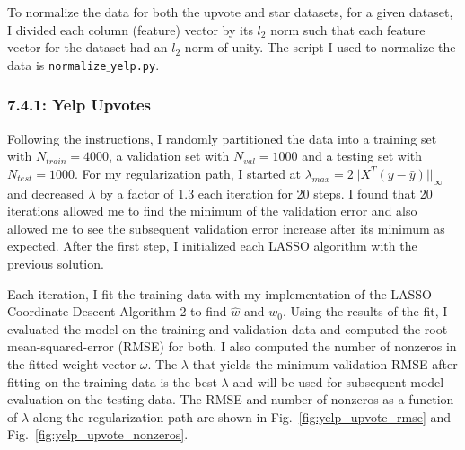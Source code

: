 \documentclass[12pt]{amsart}
\begin{document}
To normalize the data for both the upvote and star datasets, for a given dataset, I divided each column (feature) vector by its $l_2$ norm such that each feature vector for the dataset had an $l_2$ norm of unity.  The script I used to normalize the data is {\tt normalize$\_$yelp.py}.

\subsubsection*{7.4.1: Yelp Upvotes}

Following the instructions, I randomly partitioned the data into a training set with $N_{train} = 4000$, a validation set with $N_{val} = 1000$ and a testing set with $N_{test} = 1000$.  For my regularization path, I started at $\lambda_{max} = 2 ||X^{T}(y - \bar{y}) ||_{\infty}$ and decreased $\lambda$ by a factor of 1.3 each iteration for 20 steps.  I found that 20 iterations allowed me to find the minimum of the validation error and also allowed me to see the subsequent validation error increase after its minimum as expected.  After the first step, I initialized each LASSO algorithm with the previous solution.  

Each iteration, I fit the training data with my implementation of the LASSO Coordinate Descent Algorithm 2 to find $\hat{w}$ and $w_0$.  Using the results of the fit, I evaluated the model on the training and validation data and computed the root-mean-squared-error (RMSE) for both.  I also computed the number of nonzeros in the fitted weight vector $\omega$.  The $\lambda$ that yields the minimum validation RMSE after fitting on the training data is the best $\lambda$ and will be used for subsequent model evaluation on the testing data.  The RMSE and number of nonzeros as a function of $\lambda$ along the regularization path are shown in Fig.~\ref{fig:yelp_upvote_rmse} and Fig.~\ref{fig:yelp_upvote_nonzeros}.
\end{document}
